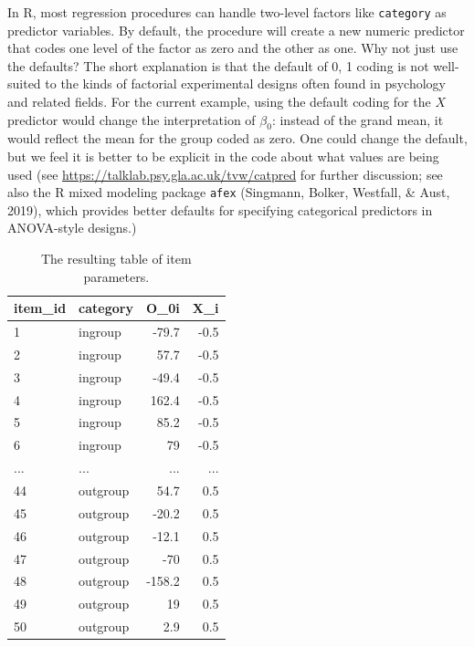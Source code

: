 \documentclass[english,doc,floatsintext]{apa6}
\begin{document}
In R, most regression procedures can handle two-level factors like \texttt{category} as predictor variables. By default, the procedure will create a new numeric predictor that codes one level of the factor as zero and the other as one. Why not just use the defaults? The short explanation is that the default of 0, 1 coding is not well-suited to the kinds of factorial experimental designs often found in psychology and related fields. For the current example, using the default coding for the \(X\) predictor would change the interpretation of \(\beta_0\): instead of the grand mean, it would reflect the mean for the group coded as zero. One could change the default, but we feel it is better to be explicit in the code about what values are being used (see \url{https://talklab.psy.gla.ac.uk/tvw/catpred} for further discussion; see also the R mixed modeling package \texttt{afex} (Singmann, Bolker, Westfall, \& Aust, 2019), which provides better defaults for specifying categorical predictors in ANOVA-style designs.)

\begin{table}[H]

\begin{center}
\begin{threeparttable}

\caption{\label{tab:items-table}The resulting table of item parameters.}

\begin{tabular}{llrr}
\toprule
item\_id & \multicolumn{1}{c}{category} & \multicolumn{1}{c}{O\_0i} & \multicolumn{1}{c}{X\_i}\\
\midrule
1 & ingroup & -79.7 & -0.5\\
2 & ingroup & 57.7 & -0.5\\
3 & ingroup & -49.4 & -0.5\\
4 & ingroup & 162.4 & -0.5\\
5 & ingroup & 85.2 & -0.5\\
6 & ingroup & 79 & -0.5\\
... & ... & ... & ...\\
44 & outgroup & 54.7 & 0.5\\
45 & outgroup & -20.2 & 0.5\\
46 & outgroup & -12.1 & 0.5\\
47 & outgroup & -70 & 0.5\\
48 & outgroup & -158.2 & 0.5\\
49 & outgroup & 19 & 0.5\\
50 & outgroup & 2.9 & 0.5\\
\bottomrule
\end{tabular}

\end{threeparttable}
\end{center}

\end{table}
\end{document}
